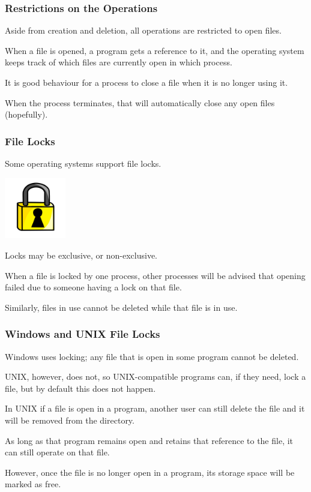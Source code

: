 \begin{frame}
\frametitle{Restrictions on the Operations}

Aside from creation and deletion, all operations are restricted to open files.

When a file is opened, a program gets a reference to it, and the operating system keeps track of which files are currently open in which process. 

It is good behaviour for a process to close a file when it is no longer using it.

When the process terminates, that will automatically close any open files (hopefully).

\end{frame}

\begin{frame}
\frametitle{File Locks}

Some operating systems support file locks.

\begin{center}
	\includegraphics[width=0.2\textwidth]{images/file-lock}
\end{center}

Locks may be exclusive, or non-exclusive. 

When a file is locked by one process, other processes will be advised that opening failed due to someone having a lock on that file. 

Similarly, files in use cannot be deleted while that file is in use. 

\end{frame}

\begin{frame}
\frametitle{Windows and UNIX File Locks}

Windows uses locking; any file that is open in some program cannot be deleted. 

UNIX, however, does not, so UNIX-compatible programs can, if they need, lock a file, but by default this does not happen. 

In UNIX if a file is open in a program, another user can still delete the file and it will be removed from the directory. 

As long as that program remains open and retains that reference to the file, it can still operate on that file. 

However, once the file is no longer open in a program, its storage space will be marked as free.

\end{frame}


